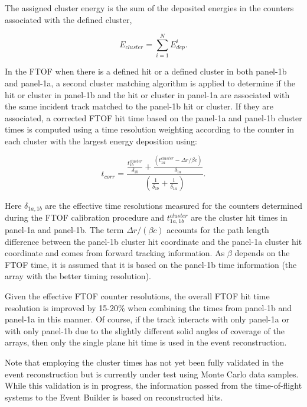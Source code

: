 The assigned cluster energy is the sum of the deposited energies in the counters associated with the defined
cluster,

\begin{equation}
  E_{cluster} = \sum_{i=1}^N E_{dep}^i.
\end{equation}

In the FTOF when there is a defined hit or a defined cluster in both panel-1b and panel-1a, a second cluster matching
algorithm is applied to determine if the hit or cluster in panel-1b and the hit or cluster in panel-1a are associated with
the same incident track matched to the panel-1b hit or cluster. If they are associated, a corrected FTOF hit time based
on the panel-1a and panel-1b cluster times is computed using a time resolution weighting according to the counter in
each cluster with the largest energy deposition using:

\begin{equation}
  t_{corr} = \frac{\displaystyle \frac{\displaystyle t_{1b}^{cluster}}{\displaystyle \delta_{1b}} +
    \frac{\displaystyle (t_{1a}^{cluster} - \Delta r/\beta c)}{\displaystyle \delta_{1a}}}
  {\displaystyle \left( \frac{\displaystyle 1}{\displaystyle \delta_{1b}} +
    \frac{\displaystyle 1}{\displaystyle \delta_{1a}} \right)}.
\end{equation}

\noindent
Here $\delta_{1a,1b}$ are the effective time resolutions measured for the counters determined during the
FTOF calibration procedure and $t_{1a,1b}^{cluster}$ are the cluster hit times in panel-1a and panel-1b. The term
$\Delta r/(\beta c)$ accounts for the path length difference between the panel-1b cluster hit coordinate and
the panel-1a cluster hit coordinate and comes from forward tracking information. As $\beta$ depends on the
FTOF time, it is assumed that it is based on the panel-1b time information (the array with the better timing
resolution).

Given the effective FTOF counter resolutions, the overall FTOF hit time resolution is improved by 15-20\%
when combining the times from panel-1b and panel-1a in this manner. Of course, if the track interacts with only
panel-1a or with only panel-1b due to the slightly different solid angles of coverage of the arrays, then only the
single plane hit time is used in the event reconstruction. 

Note that employing the cluster times has not yet been fully validated in the event reconstruction but is currently
under test using Monte Carlo data samples. While this validation is in progress, the information passed from the
time-of-flight systems to the Event Builder is based on reconstructed hits.

